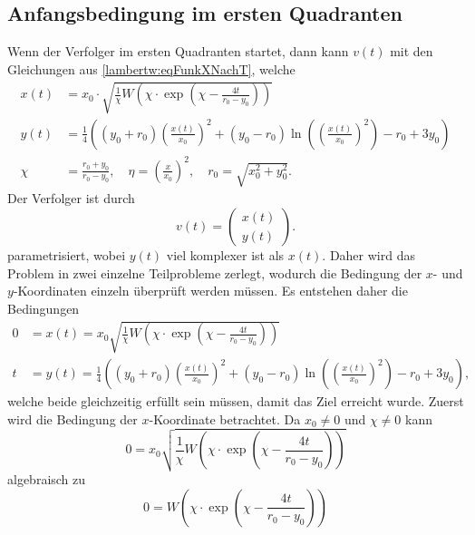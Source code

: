 \subsection{Anfangsbedingung im ersten Quadranten}
%
Wenn der Verfolger im ersten Quadranten startet, dann kann $v(t)$ mit den Gleichungen aus \eqref{lambertw:eqFunkXNachT}, welche
\begin{align}
    x\left(t\right)
    &=
    x_0\cdot\sqrt{\frac{1}{\chi}W\left(\chi\cdot \exp\left( \chi-\frac{4t}{r_0-y_0}\right) \right)} \\
    y(t)
    &=
    \frac{1}{4}\left(\left(y_0+r_0\right)\left(\frac{x(t)}{x_0}\right)^2+\left(y_0-r_0\right)\operatorname{ln}\left(\left(\frac{x(t)}{x_0}\right)^2\right)-r_0+3y_0\right)\\
    \chi
    &=
    \frac{r_0+y_0}{r_0-y_0}, \quad
    \eta
    =
    \left(\frac{x}{x_0}\right)^2,\quad
    r_0
    =
    \sqrt{x_0^2+y_0^2}
    \text{.}
\end{align}
%
Der Verfolger ist durch
\begin{equation}
    v(t)
    =
    \left( \begin{array}{c} x(t) \\ y(t) \end{array} \right)
    \text{.}
\end{equation}
%
parametrisiert, wobei $y(t)$ viel komplexer ist als $x(t)$.
Daher wird das Problem in zwei einzelne Teilprobleme zerlegt, wodurch die Bedingung der $x$- und $y$-Koordinaten einzeln überprüft werden müssen. Es entstehen daher die Bedingungen
%
\begin{align}
    0
    &=
    x(t)
    =
    x_0\sqrt{\frac{1}{\chi}W\left(\chi\cdot \exp\left( \chi-\frac{4t}{r_0-y_0}\right)\right)}
    \\
    t
    &=
    y(t)
    =
    \frac{1}{4}\left(\left(y_0+r_0\right)\left(\frac{x(t)}{x_0}\right)^2+\left(y_0-r_0\right)\operatorname{ln}\left(\left(\frac{x(t)}{x_0}\right)^2\right)-r_0+3y_0\right)\text{,}
\end{align}
%
welche beide gleichzeitig erfüllt sein müssen, damit das Ziel erreicht wurde.
Zuerst wird die Bedingung der $x$-Koordinate betrachtet.
Da $x_0 \neq 0$ und $\chi \neq 0$ kann
\begin{equation}
    0
    =
    x_0\sqrt{\frac{1}{\chi}W\left(\chi\cdot \exp\left( \chi-\frac{4t}{r_0-y_0}\right)\right)}
\end{equation}
algebraisch zu
\begin{equation}
    0
    =
    W\left(\chi\cdot \exp\left( \chi-\frac{4t}{r_0-y_0}\right)\right)
\end{equation}
